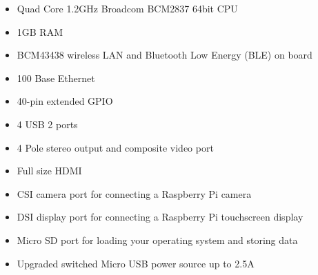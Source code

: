 \documentclass[a4paper,11pt,singlespacing]{article}
\begin{document}
				\begin{itemize}
					\item Quad Core 1.2GHz Broadcom BCM2837 64bit CPU
					\item 1GB RAM
					\item BCM43438 wireless LAN and Bluetooth Low Energy (BLE) on board
					\item 100 Base Ethernet
					\item 40-pin extended GPIO
					\item 4 USB 2 ports
					\item 4 Pole stereo output and composite video port
					\item Full size HDMI
					\item CSI camera port for connecting a Raspberry Pi camera
					\item DSI display port for connecting a Raspberry Pi touchscreen display
					\item Micro SD port for loading your operating system and storing data
					\item Upgraded switched Micro USB power source up to 2.5A  \cite{Quote_Raspberrypi3b}
				\end{itemize}
\end{document}
